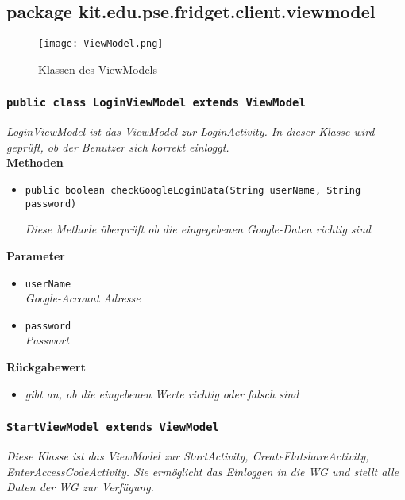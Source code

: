 		\subsection{package kit.edu.pse.fridget.client.viewmodel}
		\begin{figure}[H]
	       \centering
	       \texttt{[image: ViewModel.png]}
	       \caption{Klassen des ViewModels}
	      \end{figure}
      
		\subsubsection{\texttt{public class LoginViewModel extends ViewModel}}
        \textit{LoginViewModel ist das ViewModel zur LoginActivity. In dieser Klasse wird geprüft, ob der Benutzer sich korrekt einloggt.}\\
        
		\textbf{Methoden}
 			\begin{itemize}
        		\item{\texttt{public boolean checkGoogleLoginData(String userName, String password)}}
        	
        		\textit{Diese Methode überprüft ob die eingegebenen Google-Daten richtig sind}
        	\end{itemize}
        	
        		\textbf{Parameter}
        		\begin{itemize}
        			\item\texttt{userName}\\ 
        			\textit{Google-Account Adresse}
        			\item\texttt{password}\\ 
        			\textit{Passwort}
        		\end{itemize}

				\textbf{Rückgabewert}
				\begin{itemize} 
					\item\textit{gibt an, ob die eingebenen Werte richtig oder falsch sind}
				\end{itemize}
   
   
       \subsubsection{\texttt{StartViewModel extends ViewModel}}
        \textit{Diese Klasse ist das ViewModel zur StartActivity, CreateFlatshareActivity, EnterAccessCodeActivity. Sie ermöglicht das Einloggen in die WG und stellt alle Daten der WG zur Verfügung.}\\
        
